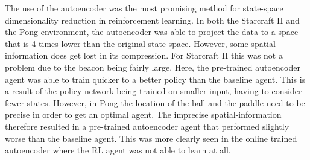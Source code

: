 The use of the autoencoder was the most promising method for state-space dimensionality reduction in reinforcement learning. In both the Starcraft II and the Pong environment, the autoencoder was able to project the data to a space that is 4 times lower than the original state-space. However, some spatial information does get lost in its compression. For Starcraft II this was not a problem due to the beacon being fairly large. Here, the pre-trained autoencoder agent was able to train quicker to a better policy than the baseline agent. This is a result of the policy network being trained on smaller input, having to consider fewer states. However, in Pong the location of the ball and the paddle need to be precise in order to get an optimal agent. The imprecise spatial-information therefore resulted in a pre-trained autoencoder agent that performed slightly worse than the baseline agent. This was more clearly seen in the online trained autoencoder where the RL agent was not able to learn at all.